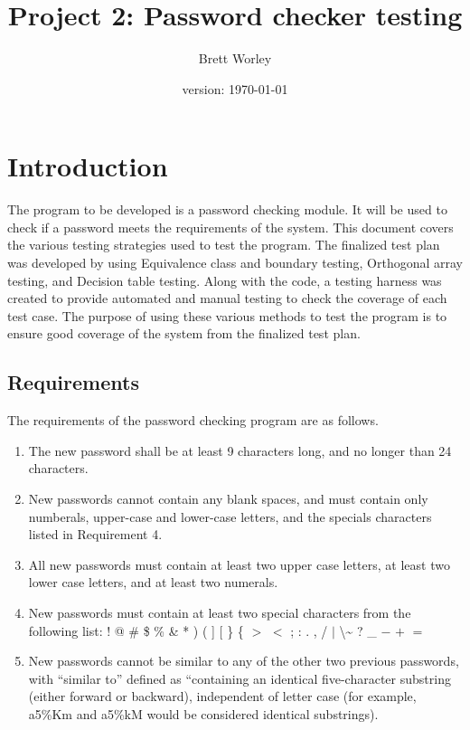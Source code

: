 \documentclass[12pt,letterpaper]{article}
\author{Brett Worley}
\title{Project 2: Password checker testing}
\date{version: \today}
\begin{document}
\maketitle
\tableofcontents



\section{Introduction}

The program to be developed is a password checking module. It will be used to check if a password
meets the requirements of the system. This document covers the various testing strategies
used to test the program. The finalized test plan was developed by using Equivalence class
and boundary testing, Orthogonal array testing, and Decision table testing. Along
with the code, a testing harness was created to provide automated and manual testing to check
the coverage of each test case. The purpose of using these various methods to test the program
is to ensure good coverage of the system from the finalized test plan.

\subsection{Requirements}

The requirements of the password checking program are as follows.

\begin{enumerate}

\item The new password shall be at least 9 characters long, and no longer than
24 characters.
\item New passwords cannot contain any blank spaces, and must contain only numberals, upper-case and lower-case letters, and
the specials characters listed in Requirement 4.
\item All new passwords must contain at least two upper case letters, at least two lower case
letters, and at least two numerals.
\item New passwords must contain at least two special characters from the following list: 
  !  @  \#  \$  \%  \&  *  )  (  ]  [  \}  \{  $>$  $<$  ; 
   :  .  ,  /  $|$   \textbackslash  \~{}  ?  \_  $-$  $+$  $=$ 

\item New passwords cannot be similar to any of the other two previous passwords, with ``similar to'' defined
as ``containing an identical five-character substring (either forward or backward), independent of letter
case (for example, a5\%Km and a5\%kM would be considered identical substrings).

\end{enumerate}
\end{document}
